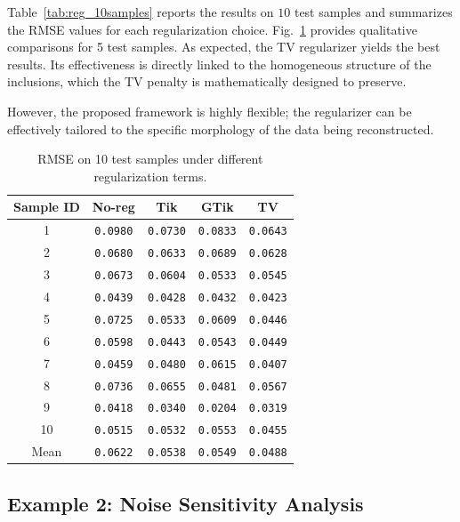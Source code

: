 \documentclass[a4paper,11pt]{article}
\theoremstyle{definition}
\theoremstyle{plain}
\theoremstyle{remark}
\begin{document}
Table~\ref{tab:reg_10samples} reports the results on $10$ test samples and summarizes the RMSE values for each regularization choice.  Fig.~\ref{more_results_reg} provides qualitative comparisons for 5 test samples.
As expected, the TV regularizer yields the best results. Its effectiveness is directly linked to the homogeneous structure of the inclusions, which the TV penalty is mathematically designed to preserve.

However, the proposed framework is highly flexible; the regularizer can be effectively tailored to the specific morphology of the data being reconstructed.
\begin{table}[t]
	\centering
	\caption{RMSE on 10 test samples under different regularization terms.}
	\label{tab:reg_10samples}
	\begin{tabular}{ccccc}
		\hline
		Sample ID & No-reg  & Tik & GTik & TV\\
		\hline
		1  & \texttt{0.0980} & \texttt{0.0730} & \texttt{0.0833} & \texttt{0.0643} \\
		2  & \texttt{0.0680} & \texttt{0.0633} & \texttt{0.0689} & \texttt{0.0628} \\
		3  & \texttt{0.0673} & \texttt{0.0604} & \texttt{0.0533} & \texttt{0.0545} \\
		4  & \texttt{0.0439} & \texttt{0.0428} & \texttt{0.0432} & \texttt{0.0423} \\
		5  & \texttt{0.0725} & \texttt{0.0533} & \texttt{0.0609} & \texttt{0.0446} \\
		6  & \texttt{0.0598} & \texttt{0.0443} & \texttt{0.0543} & \texttt{0.0449} \\
		7  & \texttt{0.0459} & \texttt{0.0480} & \texttt{0.0615} & \texttt{0.0407} \\
		8  & \texttt{0.0736} & \texttt{0.0655} & \texttt{0.0481} & \texttt{0.0567} \\
		9  & \texttt{0.0418} & \texttt{0.0340} & \texttt{0.0204} & \texttt{0.0319} \\
		10 & \texttt{0.0515} & \texttt{0.0532} & \texttt{0.0553} & \texttt{0.0455} \\
		\hline
		Mean & \texttt{0.0622} & \texttt{0.0538} & \texttt{0.0549} & \texttt{0.0488} \\
		\hline
	\end{tabular}
\label{more_results_reg}
\end{table}


\subsection{Example 2: Noise Sensitivity Analysis}\label{sub:ex2}
\end{document}
